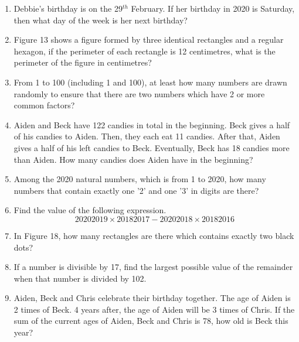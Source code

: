 \documentclass[11pt]{scrartcl}
\begin{document}
\begin{enumerate}
    \item Debbie's birthday is on the 29$^{th}$ February. If her birthday in 2020 is Saturday, then what day of the week is her next birthday?
    
    \item Figure 13 shows a figure formed by three identical rectangles and a regular hexagon, if the perimeter of each rectangle is 12 centimetres, what is the perimeter of the figure in centimetres?
    
    \item From 1 to 100 (including 1 and 100), at least how many numbers are drawn randomly to ensure that there are two numbers which have 2 or more common factors?
    
    \item Aiden and Beck have 122 candies in total in the beginning. Beck gives a half of his candies to Aiden. Then, they each eat 11 candies. After that, Aiden gives a half of his left candies to Beck. Eventually, Beck has 18 candies more than Aiden. How many candies does Aiden have in the beginning?
    
    \item Among the 2020 natural numbers, which is from 1 to 2020, how many numbers that contain exactly one '2' and one '3' in digits are there?
    
    \item Find the value of the following expression.
    \[20202019 \times 20182017 - 20202018 \times 20182016\]
    
    \item In Figure 18, how many rectangles are there which contains exactly two black dots?
    
    \item If a number is divisible by 17, find the largest possible value of the remainder when that number is divided by 102.
    
    \item Aiden, Beck and Chris celebrate their birthday together. The age of Aiden is 2 times of Beck. 4 years after, the age of Aiden will be 3 times of Chris. If the sum of the current ages of Aiden, Beck and Chris is 78, how old is Beck this year?
\end{enumerate}
\end{document}
